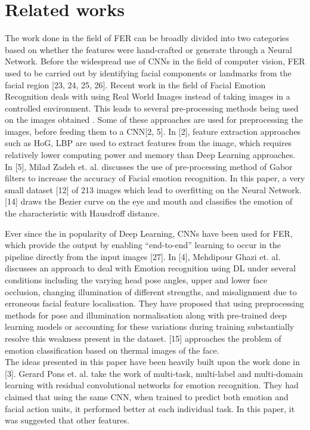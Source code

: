 \documentclass[letterpaper,10pt]{article}
\begin{document}
\section{Related works}

The work done in the field of FER can be broadly divided into two categories based on whether the features were hand-crafted or generate through a Neural Network.
Before the widespread use of CNNs in the field of computer vision, FER used to be carried out by identifying facial components or landmarks from the facial region [23, 24, 25, 26].
Recent work in the field of Facial Emotion Recognition deals with using Real World Images instead of taking images in a controlled environment. This leads to several pre-processing methods being used on the images obtained . 
Some of these approaches are used for preprocessing the images, before feeding them to a CNN[2, 5]. In [2], feature extraction approaches such as HoG, LBP are used to extract features from the image, which requires relatively lower computing power and memory than Deep Learning approaches. In [5], Milad Zadeh et. al. discusses the use of pre-processing method of Gabor filters to increase the accuracy of Facial emotion recognition. In this paper,  a very small dataset [12] of 213 images which lead to overfitting on the Neural Network. [14] draws the Bezier curve on the eye and mouth and classifies the emotion of the characteristic with Hausdroff distance. 

Ever since the in popularity of Deep Learning, CNNs have been used for FER, which provide the output by enabling “end-to-end” learning to occur in the 
pipeline directly from the input images [27].
In [4], Mehdipour Ghazi et. al. discusses an approach to deal with Emotion recognition using DL under several conditions including the varying head pose angles, upper and lower face occlusion, changing illumination of different strengths, and misalignment due to erroneous facial feature localisation. They have proposed that using preprocessing methods for pose and illumination normalisation along with pre-trained deep learning models or accounting for these variations during training substantially resolve this weakness present in the  dataset.
[15] approaches the problem of emotion classification based on thermal images of the face. \\
The ideas presented in this paper have been heavily built upon the work done in [3]. Gerard Pons et. al. take the work of multi-task, multi-label and multi-domain learning with residual convolutional networks for emotion recognition. They had claimed that using the same CNN, when trained to predict both emotion and facial action units, it performed better at each individual task. In this paper, it was suggested that other features.
\end{document}
